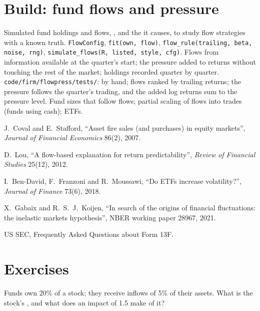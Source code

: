 \section{Build: fund flows and pressure}\label{bld:s1:flows:flowpress}

\begin{build}
 Simulated fund holdings and flows, , and the  it causes, to study flow strategies with a known truth.
 \texttt{FlowConfig}, \texttt{fit(own, flow)}, \texttt{flow\_rule(trailing, beta, noise, rng)}, \texttt{simulate\_flows(R, listed, style,
cfg)}.
 Flows from information available at the quarter's start; the pressure added to returns without touching the rest of the market; holdings
recorded quarter by quarter.
 \texttt{code/firm/flowpress/tests/}:  by hand; flows ranked by trailing returns; the pressure follows the
quarter's trading, and the added log returns sum to the pressure level.
 Fund sizes that follow flows; partial scaling of flows into trades (funds using cash); ETFs.
\end{build}

\begin{omsources}
\item J.~Coval and E.~Stafford, ``Asset fire sales (and purchases) in equity markets'', \emph{Journal of Financial Economics} 86(2), 2007.
\item D.~Lou, ``A flow-based explanation for return predictability'', \emph{Review of Financial Studies} 25(12), 2012.
\item I.~Ben-David, F.~Franzoni and R.~Moussawi, ``Do ETFs increase volatility?'', \emph{Journal of Finance} 73(6), 2018.
\item X.~Gabaix and R.~S.~J.~Koijen, ``In search of the origins of financial fluctuations: the inelastic markets hypothesis'', NBER working paper 28967,
2021.
\item US SEC, Frequently Asked Questions about Form 13F.
\end{omsources}

\section{Exercises}

\begin{exercise}[$\star$]\label{exo:s1:flows:1}
Funds own 20\% of a stock; they receive inflows of 5\% of their assets. What is the stock's , and what does an impact of 1.5 make of it?
\end{exercise}

